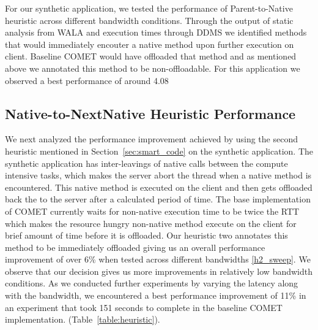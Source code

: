 For our synthetic application, we tested the performance of Parent-to-Native heuristic across different bandwidth conditions. Through the output of static analysis from WALA and execution times through DDMS we identified methods that would immediately encouter a native method upon further execution on client. Baseline COMET would have offloaded that method and as mentioned above we annotated this method to be non-offloadable. For this application we observed a best performance of around 4.08%

\subsection{Native-to-NextNative Heuristic Performance}
We next analyzed the performance improvement achieved by using the second heuristic mentioned in Section~\ref{sec:smart_code} on the synthetic application. The synthetic application has inter-leavings of native calls between the compute intensive tasks, which makes the server abort the thread when a native method is encountered. This native method is executed on the client and then gets offloaded back the to the server after a calculated period of time. The base implementation of COMET currently waits for non-native execution time to be twice the RTT which makes the resource hungry non-native method execute on the client for brief amount of time before it is offloaded. Our heuristic two annotates this method to be immediately offloaded giving us an overall performance improvement of over 6\% when tested across different bandwidths \ref{h2_sweep}. We observe that our decision gives us more improvements in relatively low bandwidth conditions. As we conducted further experiments by varying the latency along with the bandwidth, we encountered a best performance improvement of 11\% in an experiment that took 151 seconds to complete in the baseline COMET implementation. (Table~\ref{table:heuristic}).

